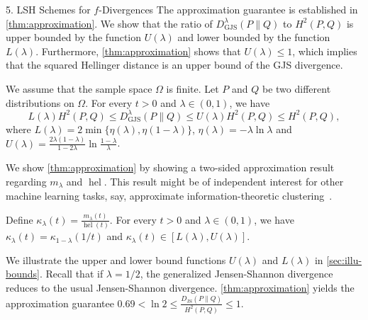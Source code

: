 \documentclass[final]{beamer}
\DeclareMathOperator{\hel}{hel}
\newcommand{\js}[2]{D_{\mathrm{JS}}( #1 \parallel #2 )}
\newcommand{\wjs}[3]{D_{\mathrm{GJS}}^{#1}( #2 \parallel #3 )}
\newlength{\onecolwid}
\begin{document}
\begin{frame}[t]
\begin{columns}[t]
\begin{column}{\onecolwid}
\begin{block}{5. LSH Schemes for $ f $-Divergences}
		The approximation guarantee is established in \cref{thm:approximation}. 
		We show 
		that the ratio of $ \wjs{\lambda}{P}{Q} $ to $ H^2(P,Q) $ is upper 
		bounded by the function $ U(\lambda) $ and lower bounded by the 
		function $ 
		L(\lambda) $. Furthermore, \cref{thm:approximation} shows that $ 
		U(\lambda)\le 
		1 $, which implies that the squared Hellinger distance is an upper 
		bound of the 
		GJS divergence.
		\begin{theorem}\label{thm:approximation}
			We assume that the sample space $ \Omega $ is finite. Let $ P $ and 
			$ Q $ 
			be two different distributions on $ \Omega $.
			For every  $ 
			t>0 $ 
			and $ \lambda\in (0,1) $, we have
			\begin{equation*}
			L(\lambda)H^2(P, Q)\le 	\wjs{\lambda}{P}{Q}
			\le  U(\lambda)H^2(P, Q)\le 
			H^2(P, 
			Q) ,
			\end{equation*}
			where $ L(\lambda) = 2 \min\{ \eta(\lambda), 
			\eta(1-\lambda) \} $, $ \eta(\lambda) = -\lambda \ln \lambda $ and 
			$ 
			U(\lambda) = 
			\frac{2\lambda(1-\lambda)}{1-2\lambda}\ln \frac{1-\lambda}{\lambda} 
			$.
		\end{theorem}
		
		We show \cref{thm:approximation} by showing a two-sided approximation 
		result regarding $ m_\lambda $ and $ \hel $. This result might be of 
		independent interest for other machine learning tasks, say, approximate 
		information-theoretic clustering~\cite{chaudhuri2008finding}.
		\begin{lemma}\label{lem:bound}
			Define $ \kappa_\lambda(t) = \frac{m_\lambda(t)}{\hel(t)} $. For 
			every 
			$ 
			t>0 $ 
			and $ \lambda\in (0,1) $, we have
			$
			\kappa_\lambda(t) = \kappa_{1-\lambda}(1/t)
			$ and $
			\kappa_\lambda(t) \in [L(\lambda), U(\lambda) ]
			$.
		\end{lemma}
		
		We illustrate the upper and lower bound functions $ U(\lambda) $ and $ 
		L(\lambda) $ in \cref{sec:illu-bounds}. Recall that if $ \lambda=1/2 $, 
		the generalized Jensen-Shannon divergence reduces to the usual 
		Jensen-Shannon 
		divergence. \cref{thm:approximation} yields the approximation 
		guarantee
		$
		0.69< \ln 2 \le \frac{\js{P}{Q}}{H^2(P, Q)} \le 1$.
		

\end{block}
\end{column}
\end{columns}
\end{frame}
\end{document}
